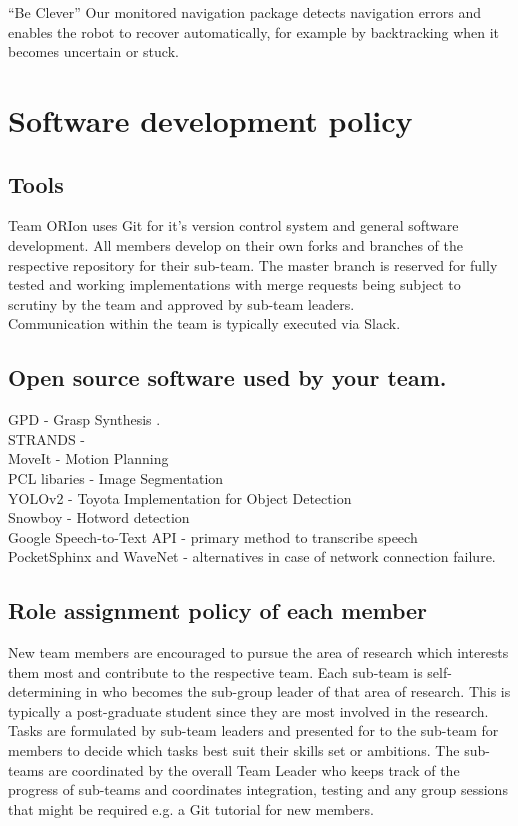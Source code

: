 \documentclass[runningheads,a4paper]{llncs}
\begin{document}
“Be Clever” Our monitored navigation package detects navigation errors and enables the robot to recover automatically, for example by backtracking when it becomes uncertain or stuck. 

\section{Software development policy}
\subsection{Tools}
Team ORIon uses Git for it's version control system and general software development. All members develop on their own forks and branches of the respective repository for their sub-team. The master branch is reserved for fully tested and working implementations with merge requests being subject to scrutiny by the team and approved by sub-team leaders.\\
Communication within the team is typically executed via Slack.

\subsection{Open source software used by your team.}
GPD - Grasp Synthesis \cite{GPD1} \cite{GPD2}.\\
STRANDS -  \\
MoveIt - Motion Planning \\
PCL libaries - Image Segmentation \\
YOLOv2 - Toyota Implementation for Object Detection\\
Snowboy - Hotword detection\\
Google Speech-to-Text API - primary method to transcribe speech\\
PocketSphinx and WaveNet - alternatives in case of network connection failure. 

\subsection{Role assignment policy of each member}
New team members are encouraged to pursue the area of research which interests them most and contribute to the respective team. Each sub-team is self-determining in who becomes the sub-group leader of that area of research. This is typically a post-graduate student since they are most involved in the research. Tasks are formulated by sub-team leaders and presented for to the sub-team for members to decide which tasks best suit their skills set or ambitions. The sub-teams are coordinated by the overall Team Leader who keeps track of the progress of sub-teams and coordinates integration, testing and any group sessions that might be required e.g. a Git tutorial for new members.
\end{document}
